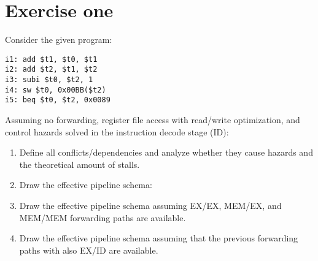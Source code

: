 \section{Exercise one}

Consider the given program:
\begin{verbatim}
i1: add $t1, $t0, $t1
i2: add $t2, $t1, $t2
i3: subi $t0, $t2, 1
i4: sw $t0, 0x00BB($t2)
i5: beq $t0, $t2, 0x0089   
\end{verbatim}
Assuming no forwarding, register file access with read/write optimization, and control hazards solved in the instruction decode stage (ID):
\begin{enumerate}
    \item Define all conflicts/dependencies and analyze whether they cause hazards and the theoretical amount of stalls.
    \item Draw the effective pipeline schema:
    \item Draw the effective pipeline schema assuming EX/EX, MEM/EX, and MEM/MEM forwarding paths are available. 
    \item Draw the effective pipeline schema assuming that the previous forwarding paths with also EX/ID are available.
\end{enumerate}

